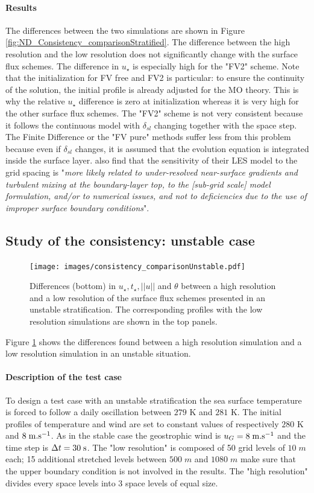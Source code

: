 \paragraph{Results} The differences between the two simulations are shown in Figure
\ref{fig:ND_Consistency_comparisonStratified}.
The difference between the high resolution and the low resolution
does not significantly change with the surface flux schemes.
The difference in $u_\star$ is especially high for the "FV2" scheme.
Note that the initialization for FV free and FV2 is particular:
to ensure the continuity of the solution,
the initial profile is already adjusted for the
MO theory. This is why the relative $u_\star$ difference is zero
at initialization whereas it is very high for the other surface flux
schemes.
%
The "FV2" scheme is not very consistent because it follows the
continuous model with $\delta_{sl}$ changing together with the
space step.
The Finite Difference or the "FV pure" methods suffer
less from this problem because even if $\delta_{sl}$ changes,
it is assumed that the evolution equation is
integrated inside the surface layer.
\cite{maronga_improved_2020} also find that the
sensitivity of their LES model to the grid spacing is
"\textit{more
likely related to under-resolved near-surface gradients
and turbulent mixing at the boundary-layer top, to the
[sub-grid scale] model formulation, and/or to numerical issues,
and not to deficiencies due to the use of improper surface
boundary conditions}".
\subsection{Study of the consistency: unstable case}
\begin{figure}
	\centering
	\texttt{[image: images/consistency\_comparisonUnstable.pdf]}
	\caption{Differences (bottom) in $u_\star, t_\star, ||u||$ and $\theta$
	between a high resolution and a low resolution
	of the surface flux schemes presented in an unstable
	stratification. The corresponding profiles
	with the low resolution simulations are shown in
	the top panels.
	}
	\label{fig:ND_Consistency_comparisonUnstable}
\end{figure}
Figure \ref{fig:ND_Consistency_comparisonUnstable}
shows the differences found between a high resolution simulation
and a low resolution simulation in an unstable situation.
\paragraph{Description of the test case}
To design a test case with an unstable stratification
the sea surface temperature is forced to follow a daily oscillation
between $279$ K and $281$ K.
The initial profiles of temperature and wind
are set to constant values of respectively $280$ K and
$8 \; {\rm m}.{\rm s}^{-1}$.
As in the stable case the geostrophic wind is
$u_G = 8 \;{\rm m}.{\rm s}^{-1}$
and the time step is $\Delta t = 30 \;{\rm s}$.
The "low resolution" is composed of 50 grid levels of $10 \; m$
each; 15 additional stretched levels between $500 \; m$ and
$1080 \; m$ make sure that the upper boundary condition
is not involved in the results.
The "high resolution" divides every space levels into
3 space levels of equal size.
